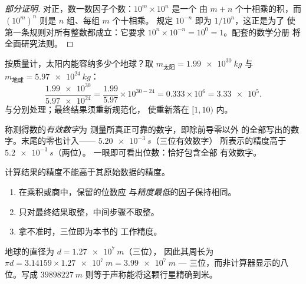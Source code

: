 \begin{proof}[部分证明]
对正，数一数因子个数：$10^{m} \times 10^{n}$ 是一个
由 $m + n$ 个十相乘的积，而 $(10^m)^n$ 则是 $n$ 组、每组 $m$ 个十相乘。
规定 $10^{-n}$ 即为 $1/10^{n}$，这正是为了
使第一条规则对所有整数都成立：它要求
$10^{n} \times 10^{-n} = 10^{0} = 1$。配套的数学分册
将全面研究法则。
\end{proof}

\begin{example}[用科学记数法计算]\label{ex:g10:orders-of-magnitude:scinot}
按质量计，太阳内能容纳多少个地球？取
$m_{\text{太阳}} = \qty{1.99e30}{kg}$ 与
$m_{\text{地球}} = \qty{5.97e24}{kg}$：
\[
\frac{\num{1.99e30}}{\num{5.97e24}}
= \frac{1.99}{5.97} \times 10^{30-24}
= 0.333 \times 10^{6}
= \num{3.33e5}.
\]
与分别处理；最终结果须重新规范化，
使重新落在 $[1, 10)$ 内。
\end{example}

\begin{definition}[有效数字]\label{def:g10:orders-of-magnitude:sigfig}
称测得数的\emph{有效数字}为
测量所真正可靠的数字，即除前导零以外
的全部写出的数字。末尾的零也计入——
$\qty{5.20e-3}{s}$（三位有效数字）
所表示的精度高于 $\qty{5.2e-3}{s}$（两位）。
一眼即可看出位数：恰好包含全部
有效数字。
\end{definition}

\begin{method}[保留几位数字]\label{met:g10:orders-of-magnitude:sigfig}
计算结果的精度不能高于其原始数据的精度。
\begin{enumerate}
  \item 在乘积或商中，保留的位数应
        与\emph{精度最低}的因子保持相同。
  \item 只对最终结果取整，中间步骤不取整。
  \item 拿不准时，三位即为本书的
        工作精度。
\end{enumerate}
\end{method}

\begin{example}[地球的周长]\label{ex:g10:orders-of-magnitude:sigfig}
地球的直径为 $d = \qty{1.27e7}{m}$（三位），
因此其周长为
$\pi d = \num{3.14159} \times \qty{1.27e7}{m} = \qty{3.99e7}{m}$ ---
三位，而非计算器显示的八位。写成
$\qty{39898227}{m}$ 则等于声称能将这颗行星精确到米。
\end{example}


